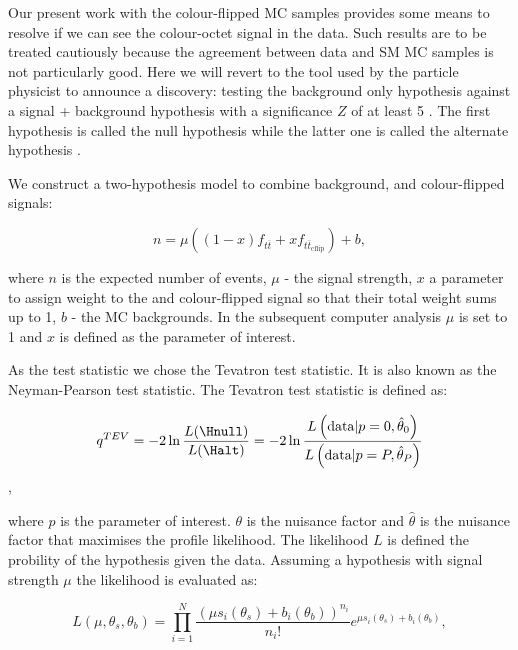 \label{subsec:hypo_testing}

Our present work with the colour-flipped MC samples provides some means to resolve if we can see the colour-octet \PW signal in the data. Such results are to be treated cautiously because the agreement between data and SM MC samples is not particularly good. Here we will revert to the tool used by the particle physicist to announce a discovery: testing the background only hypothesis against a signal + background hypothesis with a significance $Z$ of at least 5 \cite{Cowan:2010js}. The first hypothesis is called the null hypothesis \Hnull while the latter one is called the alternate hypothesis \Halt.

We construct a two-hypothesis model to combine background, \ttbar and colour-flipped \ttbar signals:

\begin{equation}
  n=\mu\left(\left(1-x\right)f_{t\overline{t}} + xf_{t\overline{t}_{\text{cflip}}}\right) + b,
  \label{eq:two_hypo_model}
\end{equation}

where $n$ is the expected number of events, $\mu$ - the signal strength, $x$ a parameter to assign weight to the \ttbar and colour-flipped \ttbar signal so that their total weight sums up to 1, $b$ - the MC backgrounds. In the subsequent computer analysis $\mu$ is set to 1 and $x$ is defined as the parameter of interest.

As the test statistic we chose the Tevatron test statistic. It is also known as the Neyman-Pearson test statistic. The Tevatron test statistic is defined as:

\begin{equation}
  q^{TEV}=-2\ln{\frac{L(\Hnull)}{L(\Halt)}}=-2\ln{\frac{L\left(\text{data}|p=0,\hat{\theta}_{0}\right)}{L\left(\text{data}|p=P,\hat{\theta}_{P}\right)}}
\end{equation},

where $p$ is the parameter of interest. $\theta$ is the nuisance factor and $\hat{\theta}$ is the nuisance factor that maximises the profile likelihood. The likelihood $L$ is defined the probility of the hypothesis given the data. Assuming a hypothesis with signal strength $\mu$ the likelihood is evaluated as:

\begin{equation}
  L(\mu, \theta_{s}, \theta_{b}) = \prod_{i=1}^{N}\frac{(\mu s_{i}(\theta_{s}) + b_{i}(\theta_{b}))^{n_{i}}}{n_{i}!}e^{\mu s_{i}(\theta_{s}) + b_{i}(\theta_{b})},
\end{equation}

